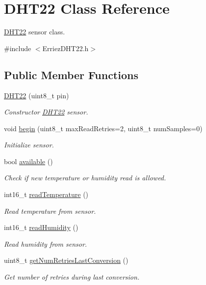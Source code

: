 \hypertarget{class_d_h_t22}{}\section{D\+H\+T22 Class Reference}
\label{class_d_h_t22}


\hyperlink{class_d_h_t22}{D\+H\+T22} sensor class.  




{\ttfamily \#include $<$Erriez\+D\+H\+T22.\+h$>$}

\subsection*{Public Member Functions}
\begin{DoxyCompactItemize}
\item 
\hyperlink{class_d_h_t22_a6983635331e939d679888b4a936e0f53}{D\+H\+T22} (uint8\+\_\+t pin)
\begin{DoxyCompactList}\small\item\em Constructor \hyperlink{class_d_h_t22}{D\+H\+T22} sensor. \end{DoxyCompactList}\item 
void \hyperlink{class_d_h_t22_ac33c0371f23ea0172934b5a04fc2dbfd}{begin} (uint8\+\_\+t max\+Read\+Retries=2, uint8\+\_\+t num\+Samples=0)
\begin{DoxyCompactList}\small\item\em Initialize sensor. \end{DoxyCompactList}\item 
bool \hyperlink{class_d_h_t22_a70b4c57d73f985e715bd523f15ccae25}{available} ()
\begin{DoxyCompactList}\small\item\em Check if new temperature or humidity read is allowed. \end{DoxyCompactList}\item 
int16\+\_\+t \hyperlink{class_d_h_t22_aeed4f98e419ffb07d3e4c09ebc10162c}{read\+Temperature} ()
\begin{DoxyCompactList}\small\item\em Read temperature from sensor. \end{DoxyCompactList}\item 
int16\+\_\+t \hyperlink{class_d_h_t22_a4ff2d9fac4b8ecf1d72f71bb861c8dcf}{read\+Humidity} ()
\begin{DoxyCompactList}\small\item\em Read humidity from sensor. \end{DoxyCompactList}\item 
uint8\+\_\+t \hyperlink{class_d_h_t22_a2a6202258c0705df3499b65a74a85067}{get\+Num\+Retries\+Last\+Conversion} ()
\begin{DoxyCompactList}\small\item\em Get number of retries during last conversion. \end{DoxyCompactList}\end{DoxyCompactItemize}


